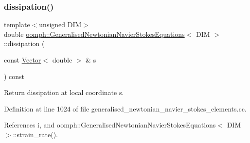 \subsubsection{\texorpdfstring{dissipation()}{dissipation()}\hspace{0.1cm}{\footnotesize\ttfamily [2/2]}}
{\footnotesize\ttfamily template$<$unsigned D\+IM$>$ \\
double \hyperlink{classoomph_1_1GeneralisedNewtonianNavierStokesEquations}{oomph\+::\+Generalised\+Newtonian\+Navier\+Stokes\+Equations}$<$ D\+IM $>$\+::dissipation (\begin{DoxyParamCaption}\item[{const \hyperlink{classoomph_1_1Vector}{Vector}$<$ double $>$ \&}]{s }\end{DoxyParamCaption}) const}



Return dissipation at local coordinate s. 



Definition at line 1024 of file generalised\+\_\+newtonian\+\_\+navier\+\_\+stokes\+\_\+elements.\+cc.



References i, and oomph\+::\+Generalised\+Newtonian\+Navier\+Stokes\+Equations$<$ D\+I\+M $>$\+::strain\+\_\+rate().

\mbox{\label{classoomph_1_1GeneralisedNewtonianNavierStokesEquations_a00027d27dfdf3c0b72b0d1df9addfdc8}} 
